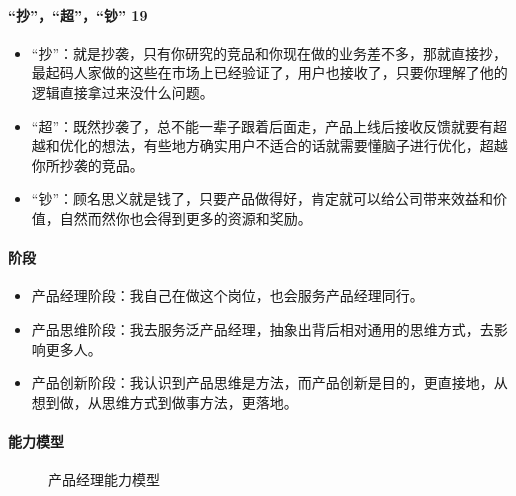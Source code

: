 \documentclass[letterpaper,11pt,english]{sphinxmanual}
\begin{document}
\paragraph{“抄”，“超”，“钞” 19\sphinxfootnotemark[64]}
\label{\detokenize{chapter_introduction/PM:id25}}%
\begin{footnotetext}[64]\sphinxAtStartFootnote
{}
%
\end{footnotetext}\ignorespaces \begin{itemize}
\item {} 
“抄”：就是抄袭，只有你研究的竞品和你现在做的业务差不多，那就直接抄，最起码人家做的这些在市场上已经验证了，用户也接收了，只要你理解了他的逻辑直接拿过来没什么问题。

\item {} 
“超”：既然抄袭了，总不能一辈子跟着后面走，产品上线后接收反馈就要有超越和优化的想法，有些地方确实用户不适合的话就需要懂脑子进行优化，超越你所抄袭的竞品。

\item {} 
“钞”：顾名思义就是钱了，只要产品做得好，肯定就可以给公司带来效益和价值，自然而然你也会得到更多的资源和奖励。

\end{itemize}


\paragraph{阶段}
\label{\detokenize{chapter_introduction/PM:id26}}\begin{itemize}
\item {} 
产品经理阶段：我自己在做这个岗位，也会服务产品经理同行。

\item {} 
产品思维阶段：我去服务泛产品经理，抽象出背后相对通用的思维方式，去影响更多人。

\item {} 
产品创新阶段：我认识到产品思维是方法，而产品创新是目的，更直接地，从想到做，从思维方式到做事方法，更落地。

\end{itemize}


\paragraph{能力模型}
\label{\detokenize{chapter_introduction/PM:id27}}
\begin{figure}[H]
\centering
\capstart

\noindent{}
\caption{产品经理能力模型}\label{\detokenize{chapter_introduction/PM:id35}}\end{figure}
\end{document}
